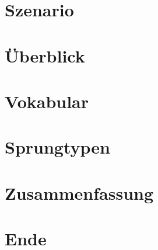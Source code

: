 \documentclass[hyperref={pdfpagelabels=false},usepdftitle=false]{beamer}
\begin{document}
\title{\titleText}
\subtitle{}
\author{\tutor}
\date{28. Februar 2014}
\subject{Proseminar Informatik}

\frame{\titlepage}


\section{Szenario}


\section{Überblick}


\section{Vokabular}


\section{Sprungtypen}


\section{Zusammenfassung}


\section{Ende}

\end{document}
